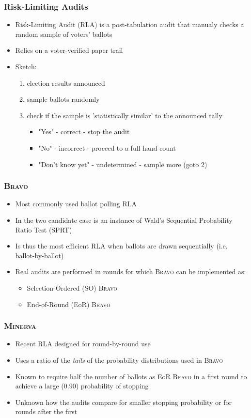 \documentclass{beamer}
\newcommand{\Minerva}{\textsc{Minerva}\xspace}
\newcommand{\BRAVO}{\textsc{Bravo}\xspace}
\begin{document}
\begin{frame}
\frametitle{Risk-Limiting Audits}

\begin{itemize}
\item Risk-Limiting Audit (RLA) is a post-tabulation audit that manualy
checks a random sample of voters' ballots
\item Relies on a voter-verified paper trail
\item Sketch:
\begin{enumerate}
\item election results announced
\item sample ballots randomly
\item check if the sample is 'statistically similar' to the announced tally
\begin{itemize}
\item "Yes" - correct - stop the audit
\item "No" - incorrect - proceed to a full hand count
\item "Don't know yet" - undetermined - sample more (goto 2)
\end{itemize}
\end{enumerate}
\end{itemize}
\end{frame}

\begin{frame}
\frametitle{\BRAVO}
\begin{itemize}
\item Most commonly used ballot polling RLA
\item In the two candidate case is an instance of Wald's Sequential Probability Ratio Test (SPRT)
\item Is thus the most efficient RLA when ballots are drawn sequentially (i.e. ballot-by-ballot)
\item Real audits are performed in rounds for which \BRAVO can be implemented as:
\begin{itemize}
\item Selection-Ordered (SO) \BRAVO
\item End-of-Round (EoR) \BRAVO
\end{itemize}
\end{itemize}
\end{frame}

\begin{frame}
\frametitle{\Minerva}
\begin{itemize}
\item Recent RLA designed for round-by-round use
\item Uses a ratio of the \emph{tails} of the probability distributions used in \BRAVO
\item Known to require half the number of ballots as EoR \BRAVO in a first round to achieve a large ($0.90$) probability of stopping
\item Unknown how the audits compare for smaller stopping probability or for rounds after the first
\end{itemize}
\end{frame}
\end{document}
